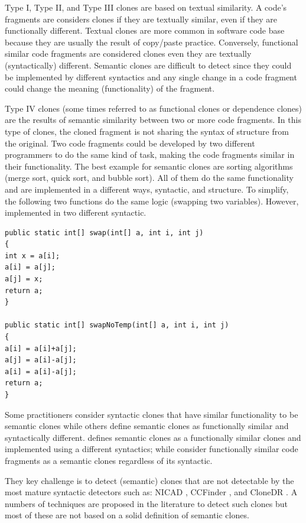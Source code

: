 Type I, Type II, and Type III clones are based on textual similarity. A code's fragments are considers clones if they are textually similar, even if they are functionally different. Textual clones are more common in software code base because they are usually the result of copy/paste practice. Conversely, functional similar code fragments are considered clones even they are textually (syntactically) different. Semantic clones are difficult to detect since they could be implemented by different syntactics and any single change in a code fragment could change the meaning (functionality) of the fragment.


Type IV clones (some times referred  to as functional clones or dependence clones)  are the results of semantic similarity between two or more code fragments. In this type of clones, the cloned fragment is not sharing the syntax of structure from the original. Two code fragments could be developed by two different programmers to do the same kind of task, making the code fragments similar in their functionality. The best example for semantic clones are sorting algorithms (merge sort, quick sort, and bubble sort). All of them do the same functionality and are implemented in a different ways, syntactic, and structure. To simplify, the following two functions do the same logic (swapping two variables). However, implemented in two different  syntactic.


\begin{lstlisting}
public static int[] swap(int[] a, int i, int j)
{
int x = a[i];
a[i] = a[j];
a[j] = x;
return a;
}

public static int[] swapNoTemp(int[] a, int i, int j)
{
a[i] = a[i]+a[j];
a[j] = a[i]-a[j];
a[i] = a[i]-a[j];
return a;
}

\end{lstlisting}

Some practitioners consider syntactic clones that have similar functionality to be semantic clones while others define semantic clones as functionally similar and syntactically different. \cite{Roy2007} defines semantic clones as a functionally similar clones and implemented using a different syntactics; while \cite{Davey1995,Elva2013, Elva2012} consider functionally similar code fragments as a semantic clones regardless of its syntactic. 



They key challenge is to detect  (semantic) clones that are not detectable by the most mature syntactic detectors such as: NICAD \cite{Roy2008}, CCFinder \cite{Kamiya2002}, and CloneDR \cite{Baxter1998}. A numbers of techniques are proposed in the literature to detect such clones \cite{Higo2011,Keivanloo2012b,Elva2012, Gabel2008} but most of these are not based on a solid definition of semantic clones.


